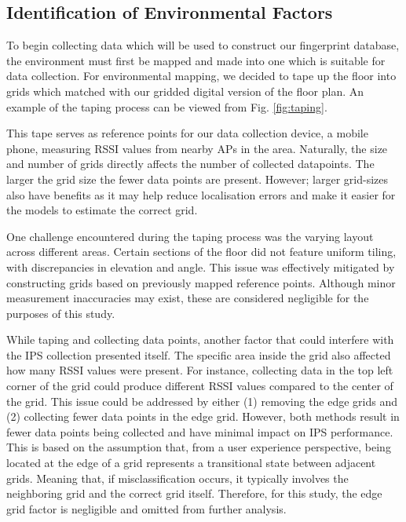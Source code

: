 \documentclass[conference]{IEEEtran}
\begin{document}
	
	
	\subsection{Identification of Environmental Factors}
	To begin collecting data which will be used to construct our fingerprint database, the environment must first be mapped and made into one which is suitable for data collection. For environmental mapping, we decided to tape up the floor into grids which matched with our gridded digital version of the floor plan. An example of the taping process can be viewed from Fig. \ref{fig:taping}. 
	
	This tape serves as reference points for our data collection device, a mobile phone, measuring RSSI values from nearby APs in the area. Naturally, the size and number of grids directly affects the number of collected datapoints. The larger the grid size the fewer data points are present. However; larger grid-sizes also have benefits as it may help reduce localisation errors and make it easier for the models to estimate the correct grid.
	
	
	One challenge encountered during the taping process was the varying layout across different areas. Certain sections of the floor did not feature uniform tiling, with discrepancies in elevation and angle. This issue was effectively mitigated by constructing grids based on previously mapped reference points. Although minor measurement inaccuracies may exist, these are considered negligible for the purposes of this study.
	
	While taping and collecting data points, another factor that could interfere with the IPS collection presented itself. The specific area inside the grid also affected how many RSSI values were present. For instance, collecting data in the top left corner of the grid could produce different RSSI values compared to the center of the grid. This issue could be addressed by either (1) removing the edge grids and (2) collecting fewer data points in the edge grid. However, both methods result in fewer data points being collected and have minimal impact on IPS performance. This is based on the assumption that, from a user experience perspective, being located at the edge of a grid represents a transitional state between adjacent grids. Meaning that, if misclassification occurs, it typically involves the neighboring grid and the correct grid itself. Therefore, for this study, the edge grid factor is negligible and omitted from further analysis.
	
\end{document}
